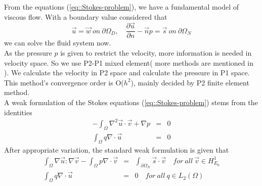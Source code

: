 \documentclass[a4paper]{article}
\begin{document}
From the equations (\ref{eq::Stokes-problem}), we have a fundamental model of viscous flow. With a boundary value considered that
\begin{equation}
\vec{u} = \vec{w} \ on \ \partial \Omega_D ,\quad \frac{\partial \vec{u}}{\partial n} - \vec{n} p = \vec{s} \ on \ \partial \Omega_N
\end{equation}
we can solve the fluid system now.\\
\indent As the pressure $p$ is given to restrict the velocity, more information is needed in velocity space. So we use P2-P1 mixed element( more methods are mentioned in \cite{Lee2005Finite}). We calculate the velocity in P2 space and calculate the pressure in P1 space. This method's convergence order is O($h^2$), mainly decided by P2 finite element method.\\
\indent A weak formulation of the Stokes equations (\ref{eq::Stokes-problem}) stems from the identities
\begin{equation}
\begin{array}{rcl}
-\int_\Omega \nabla^2 \vec{u} \cdot \vec{v} + \nabla p &=& 0\\
\int_\Omega q\nabla \cdot \vec{u} &=&0
\label{eq::Stokes-weakform}
\end{array}
\end{equation}
\indent After appropriate variation, the standard weak formulation is given that
\begin{equation}
\begin{array}{rcl}
\int_\Omega \nabla \vec{u} : \nabla \vec{v} - \int_\Omega p\nabla \cdot \vec{v} &=& \int_{\partial \Omega_N}\vec{s}\cdot \vec{v} \quad for \ all \ \vec{v} \in H^1_{E_0}\\
\int_\Omega q\nabla \cdot \vec{u} &=& 0 \quad for \ all \ q\in L_2(\Omega)
\label{eq::Stokes}
\end{array}
\end{equation}
\end{document}
